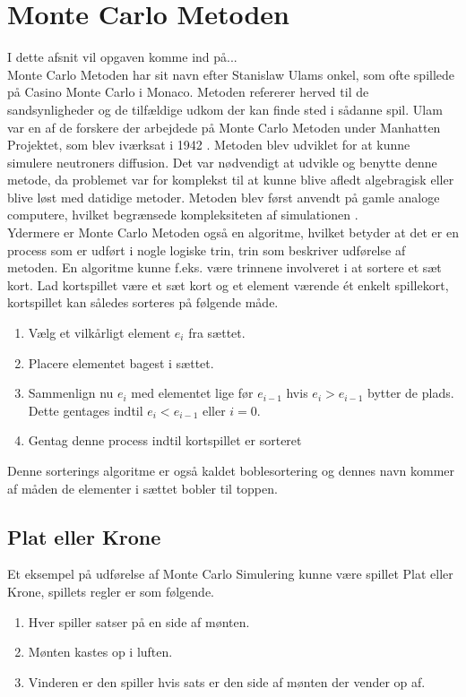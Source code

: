 \documentclass[../../SRP.tex]{subfiles}
\begin{document}
\chapter{Monte Carlo Metoden}

I dette afsnit vil opgaven komme ind på... \\

Monte Carlo Metoden har sit navn efter Stanislaw Ulams onkel, som ofte spillede på Casino Monte Carlo i Monaco. Metoden refererer herved til de sandsynligheder og de tilfældige udkom der kan finde sted i sådanne spil. Ulam var en af de forskere der arbejdede på Monte Carlo Metoden under Manhatten Projektet, som blev iværksat i 1942 \cite{MSD}. Metoden blev udviklet for at kunne simulere neutroners diffusion. Det var nødvendigt at udvikle og benytte denne metode, da problemet var for komplekst til at kunne blive afledt algebragisk eller blive løst med datidige metoder. Metoden blev først anvendt på gamle analoge computere, hvilket begrænsede kompleksiteten af simulationen \cite{AHF}. \\

Ydermere er Monte Carlo Metoden også en algoritme, hvilket betyder at det er en process som er udført i nogle logiske trin, trin som beskriver udførelse af metoden. En algoritme kunne f.eks. være trinnene involveret i at sortere et sæt kort. Lad kortspillet være et sæt kort og et element værende ét enkelt spillekort, kortspillet kan således sorteres på følgende måde.
\begin{enumerate}
  \item Vælg et vilkårligt element $e_i$ fra sættet.
  
  \item Placere elementet bagest i sættet.

  \item Sammenlign nu $e_i$ med elementet lige før $e_{i-1}$ hvis $e_i > e_{i-1}$ bytter de plads. Dette gentages indtil $e_i < e_{i-1}$ eller $i = 0$.

  \item Gentag denne process indtil kortspillet er sorteret
\end{enumerate}
Denne sorterings algoritme er også kaldet boblesortering og dennes navn kommer af måden de elementer i sættet bobler til toppen. \cite{BS} \\

\section{Plat eller Krone}
Et eksempel på udførelse af Monte Carlo Simulering kunne være spillet Plat eller Krone, spillets regler er som følgende.
\begin{enumerate}
  \item Hver spiller satser på en side af mønten.

  \item Mønten kastes op i luften.

  \item Vinderen er den spiller hvis sats er den side af mønten der vender op af.
\end{enumerate}
\end{document}
